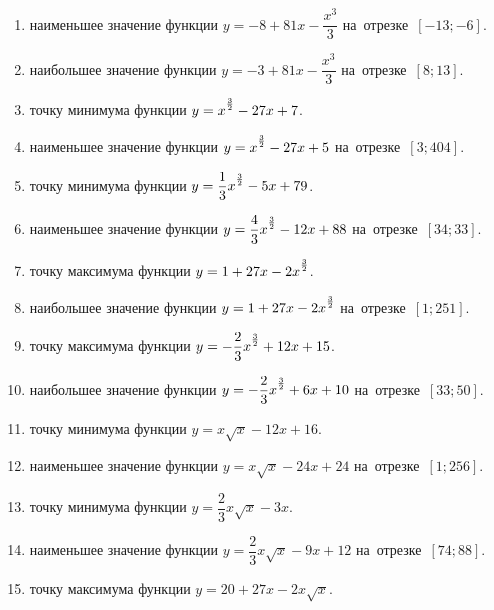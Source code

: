 \documentclass[a4paper,10pt]{article}
\begin{document}
\begin{enumerate}
\item {} наименьшее значение функции $y=-8 +81x-\dfrac{x^3}{3}$ на~отрезке~$\left[-13;-6\right]$.

\item {} наибольшее значение функции $y=-3 +81x-\dfrac{x^3}{3}$ на~отрезке~$\left[8;13\right]$.

\item {} точку минимума функции $y=x\strut^{\frac{3}{2}} -27x+7$.

\item {} наименьшее значение функции $y=x\strut^{\frac{3}{2}} -27x+5$ на~отрезке~$\left[3;404\right]$.

\item {} точку минимума функции $y=\dfrac{1}{3}x\strut^{\frac{3}{2}} -5x+79$.

\item {} наименьшее значение функции $y=\dfrac{4}{3}x\strut^{\frac{3}{2}} -12x+88$ на~отрезке~$\left[34;33\right]$.

\item {} точку максимума функции $y=1+27x-2x\strut^{\frac{3}{2}}$.

\item {} наибольшее значение функции $y=1+27x-2x\strut^{\frac{3}{2}}$ на~отрезке~$\left[1;251\right]$.

\item {} точку максимума функции $y=-\dfrac{2}{3}x\strut^{\frac{3}{2}} +12x+15$.

\item {} наибольшее значение функции $y=-\dfrac{2}{3}x\strut^{\frac{3}{2}} +6x+10$ на~отрезке~$\left[33;50\right]$.

\item {} точку минимума функции $y=x\sqrt{x} -12x+16$.

\item {} наименьшее значение функции $y=x\sqrt{x} -24x+24$ на~отрезке~$\left[1;256\right]$.

\item {} точку минимума функции $y=\dfrac{2}{3}x\sqrt{x} -3x$.

\item {} наименьшее значение функции $y=\dfrac{2}{3}x\sqrt{x} -9x+12$ на~отрезке~$\left[74;88\right]$.

\item {} точку максимума функции $y=20+27x -2x\sqrt{x}$.


\end{enumerate}
\end{document}
